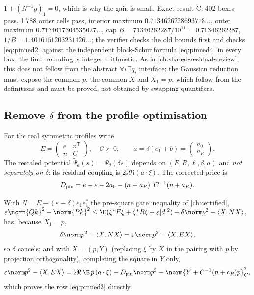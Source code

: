 $1+(N^{-1}g)_1=0$, which is why the gain is small. Exact result \st{C}: 402 boxes pass, 1,788 outer cells pass, interior maximum $0.7134626228693718\ldots$, outer maximum
$0.7134617364535627\ldots$, cap $B=71346262287/10^{11}=0.71346262287$, $1/B=1.4016151203231426\ldots$; the verifier checks the old bounds first and checks \eqref{eq:pinned2} against the
independent block-Schur formula \eqref{eq:pinned4} in every box; the final rounding is integer arithmetic. As in \autoref{ch:shared-residual-review}, this does not follow from the
abstract $\forall i\,\exists q_i$ interface: the Gaussian reduction must expose the common $p$, the common $X$ and $X_1=p$, which follow from the definitions and must be proved, not obtained by
swapping quantifiers.

\subsection{Remove $\delta$ from the profile optimisation}\label{sec:pinned-delta}
For the real symmetric profiles write
\[
E=\begin{pmatrix}e&n^{\mathsf T}\\ n&C\end{pmatrix},\quad C\succ0,\qquad a=\delta(e_1+b)=\begin{pmatrix}a_0\\a_R\end{pmatrix}.
\]
The rescaled potential $\widetilde\Psi_a(s)=\Psi_\theta(\delta s)$ depends on $(E,R,\ell,\beta,a)$ and \emph{not separately on $\delta$}: its residual coupling is $2s\Re(a\cdot\xi)$. The corrected
price is
\begin{equation}\label{eq:pinned4}
D_{\rm pin}=e-\varepsilon+2a_0-(n+a_R)^{\mathsf T}C^{-1}(n+a_R).
\end{equation}
\begin{proposition}\label{prop:deltafree}
With $N=E-(\varepsilon-\delta)e_1e_1^*$ the pre-square gate inequality of \autoref{ch:certified},
$\varepsilon\norm{Qk}^2-\norm{Pk}^2\le\E(\xi^*E\xi+\zeta^*R\zeta+\varepsilon|d|^2)+\delta\norm p^2-\langle X,NX\rangle$, has, because $X_1=p$,
\[
\delta\norm p^2-\langle X,NX\rangle=\varepsilon\norm p^2-\langle X,EX\rangle ,
\]
so $\delta$ cancels; and with $X=(p,Y)$ (replacing $\xi$ by $X$ in the pairing with $p$ by projection orthogonality), completing the square in $Y$ only,
\begin{equation}\label{eq:pinned5}
\varepsilon\norm p^2-\langle X,EX\rangle=2\Re\,\E\,\bar p\,(a\cdot\xi)-D_{\rm pin}\norm p^2-\norm{Y+C^{-1}(n+a_R)p}_C^2 ,
\end{equation}
which proves the row \eqref{eq:pinned3} directly.
\end{proposition}
